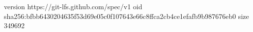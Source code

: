 version https://git-lfs.github.com/spec/v1
oid sha256:bfbb6430204635f53d69e05c0f107643e66c8ffca2cb4ce1efafb9b987676eb0
size 349692
